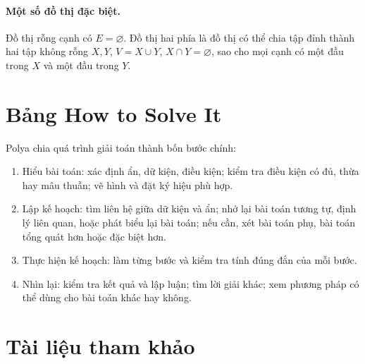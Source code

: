 \documentclass[11pt]{article}
\begin{document}
\paragraph{Một số đồ thị đặc biệt.}
Đồ thị rỗng cạnh có \(E=\varnothing\). Đồ thị hai phía là đồ thị có thể chia
tập đỉnh thành hai tập không rỗng \(X,Y\), \(V=X\cup Y\), \(X\cap Y=\varnothing\),
sao cho mọi cạnh có một đầu trong \(X\) và một đầu trong \(Y\).

\section{Bảng How to Solve It}

Polya chia quá trình giải toán thành bốn bước chính:
\begin{enumerate}
  \item Hiểu bài toán: xác định ẩn, dữ kiện, điều kiện; kiểm tra điều kiện có
  đủ, thừa hay mâu thuẫn; vẽ hình và đặt ký hiệu phù hợp.
  \item Lập kế hoạch: tìm liên hệ giữa dữ kiện và ẩn; nhớ lại bài toán tương
  tự, định lý liên quan, hoặc phát biểu lại bài toán; nếu cần, xét bài toán
  phụ, bài toán tổng quát hơn hoặc đặc biệt hơn.
  \item Thực hiện kế hoạch: làm từng bước và kiểm tra tính đúng đắn của mỗi
  bước.
  \item Nhìn lại: kiểm tra kết quả và lập luận; tìm lời giải khác; xem phương
  pháp có thể dùng cho bài toán khác hay không.
\end{enumerate}

\section{Tài liệu tham khảo}
\end{document}
